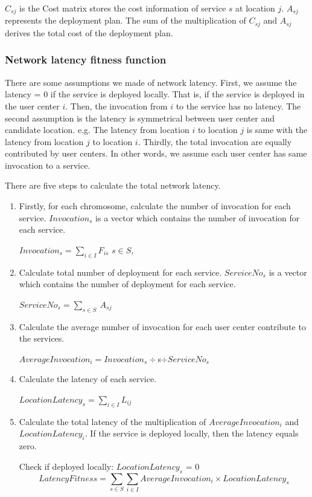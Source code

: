 \documentclass{llncs}
\begin{document}
$C_{sj}$ is the Cost matrix stores the cost information of service $s$ at location $j$. $A_{sj}$ represents the deployment plan. The sum of the multiplication of 
$C_{sj}$ and $A_{sj}$ derives the total cost of the deployment plan.

\subsubsection{Network latency fitness function}

There are some assumptions we made of network latency. First, we assume
the latency = 0 if the service is deployed locally. That is, if the service is deployed in the user center $i$. Then, the 
invocation from $i$ to the service has no latency. The second assumption is the latency is symmetrical between user center and candidate location. e.g. 
The latency from location $i$ to location $j$ is same with the latency from location $j$ to location $i$. Thirdly, the total invocation are equally
contributed by user centers. In other words, we assume each user center has same invocation to a service.


There are five steps to calculate the total network latency.
\begin{enumerate}
	\item Firstly, for each chromosome, calculate the number of invocation for each service. $Invocation_{s}$ is a vector which contains 
		the number of invocation for each service.
		\begin{center}
			$Invocation_{s} = \sum\limits_{i \in I} F_{is}$ $s \in S$,
		\end{center}
	\item Calculate total number of deployment for each service. $ServiceNo_{s}$ is a vector which contains the number of deployment for each service.
		\begin{center}
			$ServiceNo_{s} = \sum\limits_{s \in S}\ A_{sj}$
		\end{center}
	\item Calculate the average number of invocation for each user center contribute to the services.
		\begin{center}
			$AverageInvocation_{i} = Invocation_{s} \div $s$ \div ServiceNo_{s}$
		\end{center}
	\item Calculate the latency of each service.
		\begin{center}
			$LocationLatency_{s} = \sum\limits_{i \in I} L_{ij}$
		\end{center}
	\item Calculate the total latency of the multiplication of $AverageInvocation_{i}$ and $LocationLatency_{i}$.
		If the service is deployed locally, then the latency equals zero.
		\begin{center}
			Check if deployed locally: $LocationLatency_{s}$ = 0
		\begin{equation}
			LatencyFitness = \sum\limits_{s \in S}\sum\limits_{i \in I} AverageInvocation_{i} \times LocationLatency_{s}
		\end{equation}
		\end{center}
\end{enumerate}
\end{document}
